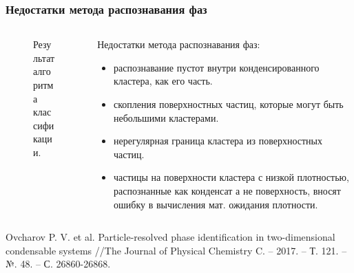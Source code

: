 \documentclass[pdf,hyperref={unicode}]{beamer}
\begin{document}
\begin{frame}
\transdissolve[duration=0.2]
\frametitle{Недостатки метода распознавания фаз}

\begin{columns}

\begin{column}{0.47\linewidth}

\begin{figure}[h]
\caption{\tiny Результат алгоритма классификации.}
\end{figure}

\end{column}


\begin{column}{0.47\linewidth}
\tiny{
Недостатки метода распознавания фаз:
\begin{itemize}
\item распознавание пустот внутри конденсированного кластера, как его часть.
\item скопления поверхностных частиц, которые могут быть небольшими кластерами.
\item нерегулярная граница кластера из поверхностных частиц.
\item частицы на поверхности кластера с низкой плотностью, распознанные как конденсат а не поверхность, вносят ошибку в вычисления мат. ожидания плотности.
\end{itemize}
}
\end{column}

\end{columns}

\vspace{5mm}
\tiny{
Ovcharov P. V. et al. Particle-resolved phase identification in two-dimensional condensable systems //The Journal of Physical Chemistry C. – 2017. – Т. 121. – №. 48. – С. 26860-26868.
}

\end{frame}
\end{document}
